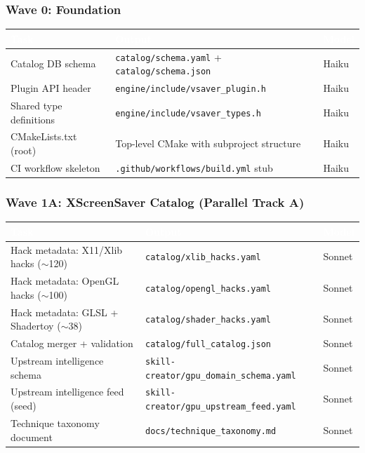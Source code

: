 \documentclass[11pt,letterpaper]{article}
\newcommand{\tableheader}[1]{\textbf{\sffamily\textcolor{white}{#1}}}
\begin{document}
\subsubsection{Wave 0: Foundation}

\begin{center}
\begin{tabularx}{\textwidth}{L{3cm}XC{1.5cm}}
\toprule
{}
\tableheader{Task} & \tableheader{Output} & \tableheader{Model} \\
\midrule
Catalog DB schema & \texttt{catalog/schema.yaml} + \texttt{catalog/schema.json} & Haiku \\
Plugin API header & \texttt{engine/include/vsaver\_plugin.h} & Haiku \\
Shared type definitions & \texttt{engine/include/vsaver\_types.h} & Haiku \\
CMakeLists.txt (root) & Top-level CMake with subproject structure & Haiku \\
CI workflow skeleton & \texttt{.github/workflows/build.yml} stub & Haiku \\
\bottomrule
\end{tabularx}
\end{center}

\subsubsection{Wave 1A: XScreenSaver Catalog (Parallel Track A)}

\begin{center}
\begin{tabularx}{\textwidth}{L{3.5cm}XC{1.5cm}}
\toprule
{}
\tableheader{Task} & \tableheader{Output} & \tableheader{Model} \\
\midrule
Hack metadata: X11/Xlib hacks ($\sim$120) & \texttt{catalog/xlib\_hacks.yaml} & Sonnet \\
Hack metadata: OpenGL hacks ($\sim$100) & \texttt{catalog/opengl\_hacks.yaml} & Sonnet \\
Hack metadata: GLSL + Shadertoy ($\sim$38) & \texttt{catalog/shader\_hacks.yaml} & Sonnet \\
Catalog merger + validation & \texttt{catalog/full\_catalog.json} & Sonnet \\
Upstream intelligence schema & \texttt{skill-creator/gpu\_domain\_schema.yaml} & Sonnet \\
Upstream intelligence feed (seed) & \texttt{skill-creator/gpu\_upstream\_feed.yaml} & Sonnet \\
Technique taxonomy document & \texttt{docs/technique\_taxonomy.md} & Sonnet \\
\bottomrule
\end{tabularx}
\end{center}
\end{document}
